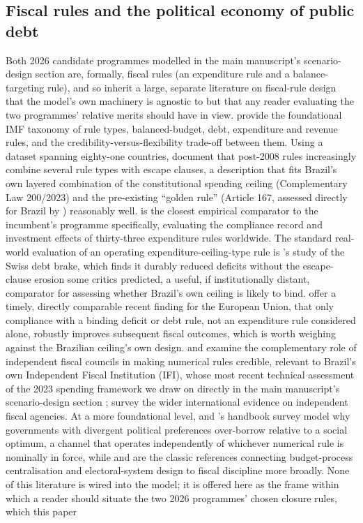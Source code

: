 \documentclass[11pt,a4paper]{article}
\begin{document}
\subsection{Fiscal rules and the political economy of public debt}
\label{sec:lit-rules}

Both 2026 candidate programmes modelled in the main manuscript's scenario-design section are, formally, fiscal rules (an expenditure rule and a balance-targeting rule), and so inherit a large, separate literature on fiscal-rule design that the model's own machinery is agnostic to but that any reader evaluating the two programmes' relative merits should have in view. \citet{kopitssymansky1998} provide the foundational IMF taxonomy of rule types, balanced-budget, debt, expenditure and revenue rules, and the credibility-versus-flexibility trade-off between them. Using a dataset spanning eighty-one countries, \citet{schaechteretal2012} document that post-2008 rules increasingly combine several rule types with escape clauses, a description that fits Brazil's own layered combination of the constitutional spending ceiling (Complementary Law 200/2023) and the pre-existing ``golden rule'' (Article 167, assessed directly for Brazil by \citealp{pires2019reggraouro}) reasonably well. \citet{cordesetal2015} is the closest empirical comparator to the incumbent's programme specifically, evaluating the compliance record and investment effects of thirty-three expenditure rules worldwide. The standard real-world evaluation of an operating expenditure-ceiling-type rule is \citet{feldkirchgassner2008}'s study of the Swiss debt brake, which finds it durably reduced deficits without the escape-clause erosion some critics predicted, a useful, if institutionally distant, comparator for assessing whether Brazil's own ceiling is likely to bind. \citet{lopezvillavicencio2025} offer a timely, directly comparable recent finding for the European Union, that only compliance with a binding deficit or debt rule, not an expenditure rule considered alone, robustly improves subsequent fiscal outcomes, which is worth weighing against the Brazilian ceiling's own design. \citet{debrunkumar2007} and \citet{wyplosz2018} examine the complementary role of independent fiscal councils in making numerical rules credible, relevant to Brazil's own Independent Fiscal Institution (IFI), whose most recent technical assessment of the 2023 spending framework we draw on directly in the main manuscript's scenario-design section \citep{ifi2023raf76}; \citet{debrunhaunerkumar2009} survey the wider international evidence on independent fiscal agencies. At a more foundational level, \citet{alesinatabellini1990} and \citet{alesinapassalacqua2016}'s handbook survey model why governments with divergent political preferences over-borrow relative to a social optimum, a channel that operates independently of whichever numerical rule is nominally in force, while \citet{vonhagenharden1995} and \citet{perssontabellini1999} are the classic references connecting budget-process centralisation and electoral-system design to fiscal discipline more broadly. None of this literature is wired into the model; it is offered here as the frame within which a reader should situate the two 2026 programmes' chosen closure rules, which this paper 
\end{document}
